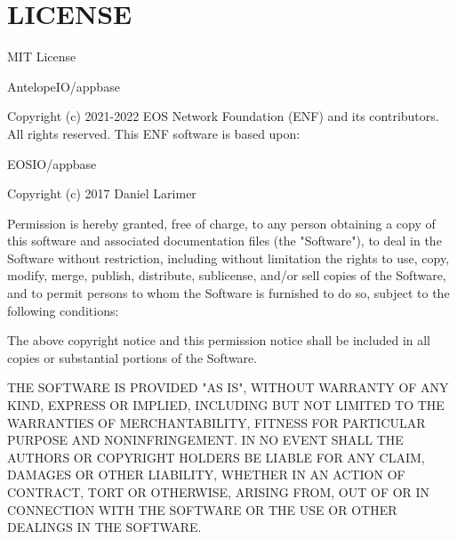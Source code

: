\chapter{LICENSE}
\hypertarget{md_libraries_2appbase_2_l_i_c_e_n_s_e}{}\label{md_libraries_2appbase_2_l_i_c_e_n_s_e}
MIT License

Antelope\+IO/appbase

Copyright (c) 2021-\/2022 EOS Network Foundation (ENF) and its contributors. All rights reserved. This ENF software is based upon\+:

EOSIO/appbase

Copyright (c) 2017 Daniel Larimer

Permission is hereby granted, free of charge, to any person obtaining a copy of this software and associated documentation files (the "{}\+Software"{}), to deal in the Software without restriction, including without limitation the rights to use, copy, modify, merge, publish, distribute, sublicense, and/or sell copies of the Software, and to permit persons to whom the Software is furnished to do so, subject to the following conditions\+:

The above copyright notice and this permission notice shall be included in all copies or substantial portions of the Software.

THE SOFTWARE IS PROVIDED "{}\+AS IS"{}, WITHOUT WARRANTY OF ANY KIND, EXPRESS OR IMPLIED, INCLUDING BUT NOT LIMITED TO THE WARRANTIES OF MERCHANTABILITY, FITNESS FOR  PARTICULAR PURPOSE AND NONINFRINGEMENT. IN NO EVENT SHALL THE AUTHORS OR COPYRIGHT HOLDERS BE LIABLE FOR ANY CLAIM, DAMAGES OR OTHER LIABILITY, WHETHER IN AN ACTION OF CONTRACT, TORT OR OTHERWISE, ARISING FROM, OUT OF OR IN CONNECTION WITH THE SOFTWARE OR THE USE OR OTHER DEALINGS IN THE SOFTWARE. 